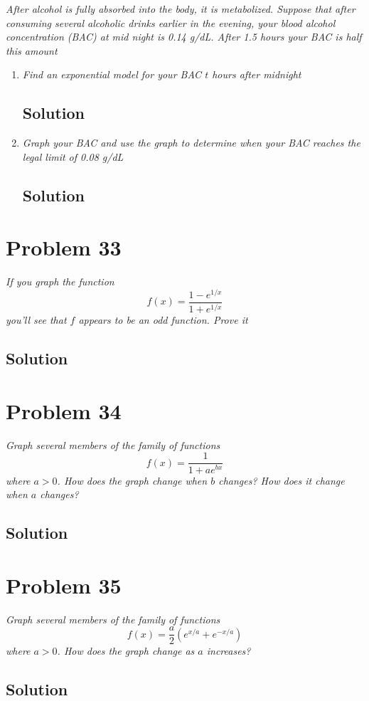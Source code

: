\documentclass[11pt]{article}
\newcommand{\soln}{\subsection*}
\newcommand{\qn}{\textit}
\begin{document}
\qn{After alcohol is fully absorbed into the body, it is metabolized. Suppose that after consuming several alcoholic drinks earlier in the evening, your blood alcohol concentration (BAC) at mid night is 0.14 g/dL. After 1.5 hours your BAC is half this amount}

\begin{enumerate}
	\item \qn{Find an exponential model for your BAC $t$ hours after midnight}
	\soln{Solution}
	
	\item \qn{Graph your BAC and use the graph to determine when your BAC reaches the legal limit of 0.08 g/dL}
	\soln{Solution}
\end{enumerate}

\section*{Problem 33}

\qn{If you graph the function $$f(x)=\frac{1-e^{1/x}}{1+e^{1/x}}$$ you'll see that $f$ appears to be an odd function. Prove it}

\soln{Solution}

\section*{Problem 34}

\qn{Graph several members of the family of functions $$f(x)=\frac{1}{1+ae^{bx}}$$ where $a>0$. How does the graph change when $b$ changes? How does it change when $a$ changes?}

\soln{Solution}

\section*{Problem 35}

\qn{Graph several members of the family of functions $$f(x)=\frac{a}{2}(e^{x/a}+e^{-x/a})$$ where $a>0$. How does the graph change as $a$ increases?}

\soln{Solution}
\end{document}
